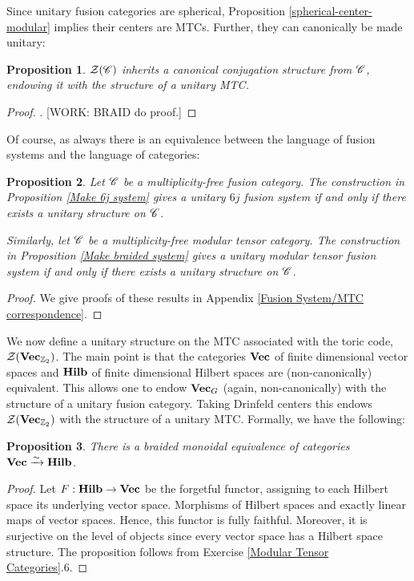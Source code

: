 \documentclass{article}
\newtheorem{proposition}{Proposition}[section]
\theoremstyle{definition}
\numberwithin{figure}{section}
\begin{document}
Since unitary fusion categories are spherical, Proposition \ref{spherical-center-modular} implies their centers are MTCs. Further, they can canonically be made unitary:

\begin{proposition}\label{unitary MTC}$ \mathcal{Z}(\mathscr{C})$ inherits a canonical conjugation structure from $\mathscr{C}$, endowing it with the structure of a unitary MTC.
\end{proposition}
\begin{proof}. [WORK: BRAID do proof.]
\end{proof}

Of course, as always there is an equivalence between the language of fusion systems and the language of categories:

\begin{proposition}\label{Make uMTC} Let $\mathscr{C}$ be a multiplicity-free fusion category. The construction in Proposition \ref{Make 6j system} gives a unitary $6j$ fusion system if and only if there exists a unitary structure on $\mathscr{C}$.

Similarly, let $\mathscr{C}$ be a multiplicity-free modular tensor category. The construction in Proposition \ref{Make braided system} gives a unitary modular tensor fusion system if and only if there exists a unitary structure on $\mathscr{C}$.
\end{proposition}
\begin{proof} We give proofs of these results in Appendix \ref{Fusion System/MTC correspondence}.
\end{proof}

We now define a unitary structure on the MTC associated with the toric code, $\mathcal{Z}(\bold{Vec}_{\mathbb{Z}_2})$. The main point is that the categories $\bold{Vec}$ of finite dimensional vector spaces and $\bold{Hilb}$ of finite dimensional Hilbert spaces are (non-canonically) equivalent. This allows one to endow $\bold{Vec}_{G}$ (again, non-canonically) with the structure of a unitary fusion category. Taking Drinfeld centers this endows $\mathcal{Z}(\bold{Vec}_{\mathbb{Z}_2})$ with the structure of a unitary MTC. Formally, we have the following:

\begin{proposition} There is a braided monoidal equivalence of categories $\bold{Vec}\xrightarrow{\sim}\bold{Hilb}$.
\end{proposition}
\begin{proof} Let $F:\bold{Hilb}\to \bold{Vec}$ be the forgetful functor, assigning to each Hilbert space its underlying vector space. Morphisms of Hilbert spaces and exactly linear maps of vector spaces. Hence, this functor is fully faithful. Moreover, it is surjective on the level of objects since every vector space has a Hilbert space structure. The proposition follows from Exercise \ref{Modular Tensor Categories}.6.
\end{proof}
\end{document}
